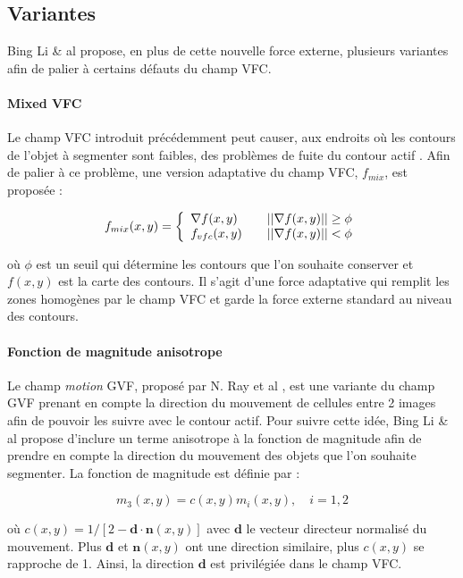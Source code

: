 \subsection{Variantes}
Bing Li \& al propose, en plus de cette nouvelle force externe, plusieurs variantes afin de palier à certains défauts du champ VFC.

\paragraph{Mixed VFC}

Le champ VFC introduit précédemment peut causer, aux endroits où les contours de l'objet à segmenter sont faibles, des problèmes de fuite du contour actif \cite{vfc}. Afin de palier à ce problème, une version adaptative du champ VFC, $f_{mix}$, est proposée :

\begin{equation}
 f_{mix}(x,y) = \left\{ 
  \begin{array}{l l}
    \nabla f(x,y) & \quad ||\nabla f(x,y)|| \geq \phi \\
     f_{vfc}(x,y) & \quad ||\nabla f(x,y)||   <  \phi
  \end{array} \right.
\end{equation}

où $\phi$ est un seuil qui détermine les contours que l'on souhaite conserver et $f(x,y)$ est la carte des contours. Il s'agit d'une force adaptative qui remplit les zones homogènes par le champ VFC et garde la force externe standard au niveau des contours.

\paragraph{Fonction de magnitude anisotrope}

Le champ \textit{motion} GVF, proposé par N. Ray et al \cite{mgvf}, est une variante du champ GVF prenant en compte la direction du mouvement de cellules entre 2 images afin de pouvoir les suivre avec le contour actif. Pour suivre cette idée, Bing Li \& al propose d'inclure un terme anisotrope à la fonction de magnitude afin de prendre en compte la direction du mouvement des objets que l'on souhaite segmenter. La fonction de magnitude est définie par :

\begin{equation}
	m_3(x,y) = c(x,y)m_i(x,y), \quad i=1,2
\end{equation}

où $c(x,y)=1/[2-\mathbf{d} \cdot \mathbf{n}(x,y)]$ avec $\mathbf{d}$ le vecteur directeur normalisé du mouvement. Plus $\mathbf{d}$ et $\mathbf{n}(x,y)$ ont une direction similaire, plus $c(x,y)$ se rapproche de 1. Ainsi, la direction $\mathbf{d}$ est privilégiée dans le champ VFC. 
